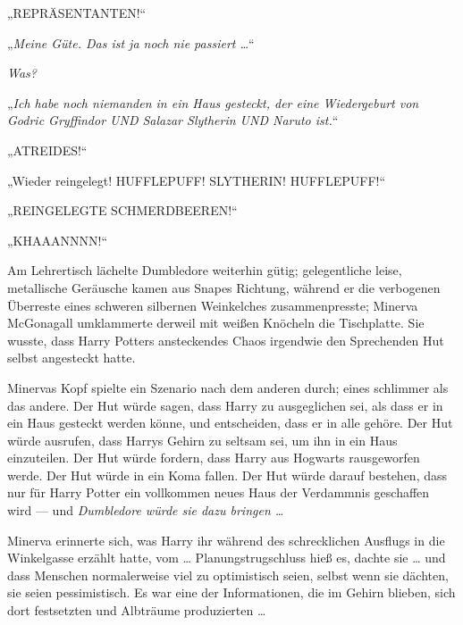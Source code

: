 \later

„\uppercase{Repräsentanten}!“

\later

„\emph{Meine Güte. Das ist ja noch nie passiert …}“

\emph{Was?}

„\emph{Ich habe noch niemanden in ein Haus gesteckt, der eine Wiedergeburt von Godric Gryffindor UND Salazar Slytherin UND Naruto ist.}“

\later

„\uppercase{Atreides}!“%

\later

„Wieder reingelegt! \uppercase{Hufflepuff! Slytherin! Hufflepuff!}“

\later

„\uppercase{Reingelegte Schmerdbeeren!}“%

\later

„KHAAANNNN!“%

\later

Am Lehrertisch lächelte Dumbledore weiterhin gütig; gelegentliche leise, metallische Geräusche kamen aus Snapes Richtung, während er die verbogenen Überreste eines schweren silbernen Weinkelches zusammenpresste; Minerva McGonagall umklammerte derweil mit weißen Knöcheln die Tischplatte. Sie wusste, dass Harry Potters ansteckendes Chaos irgendwie den Sprechenden Hut selbst angesteckt hatte.

Minervas Kopf spielte ein Szenario nach dem anderen durch; eines schlimmer als das andere. Der Hut würde sagen, dass Harry zu ausgeglichen sei, als dass er in ein Haus gesteckt werden könne, und entscheiden, dass er in alle gehöre. Der Hut würde ausrufen, dass Harrys Gehirn zu seltsam sei, um ihn in ein Haus einzuteilen. Der Hut würde fordern, dass Harry aus Hogwarts rausgeworfen werde. Der Hut würde in ein Koma fallen. Der Hut würde darauf bestehen, dass nur für Harry Potter ein vollkommen neues Haus der Verdammnis geschaffen wird — und \emph{Dumbledore würde sie dazu bringen …}

Minerva erinnerte sich, was Harry ihr während des schrecklichen Ausflugs in die Winkelgasse erzählt hatte, vom … Planungstrugschluss hieß es, dachte sie … und dass Menschen normalerweise viel zu optimistisch seien, selbst wenn sie dächten, sie seien pessimistisch. Es war eine der Informationen, die im Gehirn blieben, sich dort festsetzten und Albträume produzierten …

